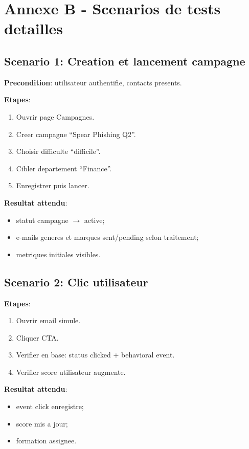 \documentclass[12pt,a4paper,oneside]{report}
\begin{document}
\chapter{Annexe B - Scenarios de tests detailles}
\section*{Scenario 1: Creation et lancement campagne}
\textbf{Precondition}: utilisateur authentifie, contacts presents.

\textbf{Etapes}:
\begin{enumerate}[leftmargin=1.2cm]
  \item Ouvrir page Campagnes.
  \item Creer campagne ``Spear Phishing Q2''.
  \item Choisir difficulte ``difficile''.
  \item Cibler departement ``Finance''.
  \item Enregistrer puis lancer.
\end{enumerate}

\textbf{Resultat attendu}:
\begin{itemize}[leftmargin=1.2cm]
  \item statut campagne $\rightarrow$ active;
  \item e-mails generes et marques sent/pending selon traitement;
  \item metriques initiales visibles.
\end{itemize}

\section*{Scenario 2: Clic utilisateur}
\textbf{Etapes}:
\begin{enumerate}[leftmargin=1.2cm]
  \item Ouvrir email simule.
  \item Cliquer CTA.
  \item Verifier en base: status clicked + behavioral event.
  \item Verifier score utilisateur augmente.
\end{enumerate}

\textbf{Resultat attendu}:
\begin{itemize}[leftmargin=1.2cm]
  \item event click enregistre;
  \item score mis a jour;
  \item formation assignee.
\end{itemize}
\end{document}
